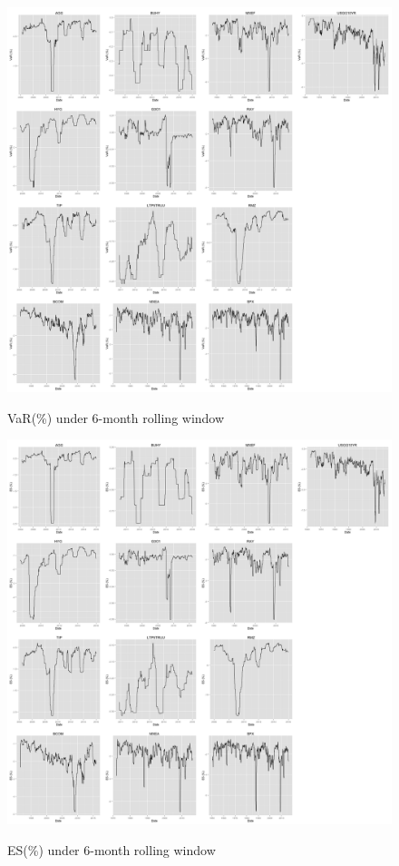 \documentclass[12pt]{article}
\begin{document}
\begin{figure}[h]
\caption{VaR(\%) under 6-month rolling window}
\centering 
\includegraphics[width=18cm]{../results/VaR6mon}
\label{fig: VaR6mon}
\end{figure}

\begin{figure}[h]
\caption{ES(\%) under 6-month rolling window} 
\centering 
\includegraphics[width=18cm]{../results/ES6mon}
\label{fig: ES6mon}
\end{figure}



% 
% 
\end{document}
